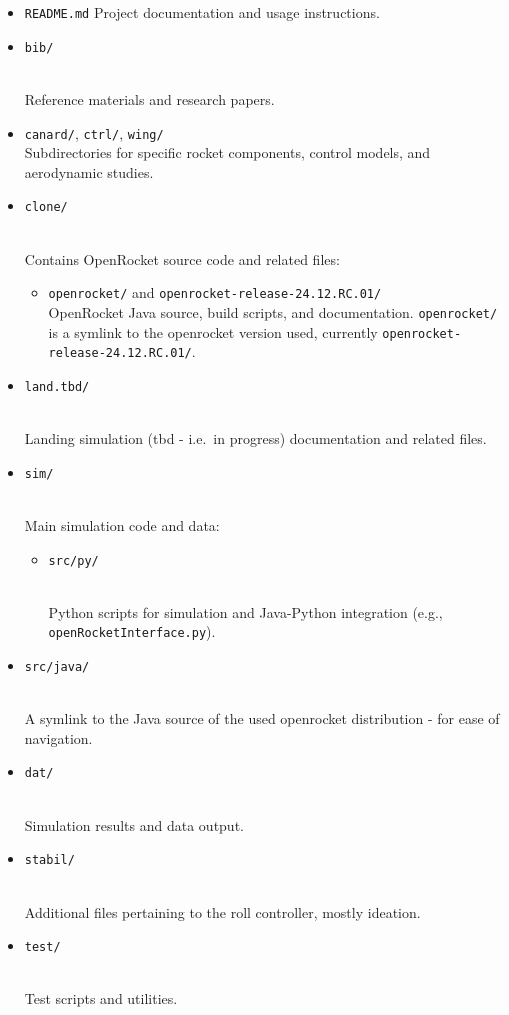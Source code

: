 \documentclass{amsdtx}
\providecommand{\tightlist}{%
  \setlength{\itemsep}{0pt}\setlength{\parskip}{0pt}}
\begin{document}
\begin{itemize}
\item
  \texttt{README.md} Project documentation and usage instructions.
\item
  \texttt{bib/}\strut \\
  Reference materials and research papers.
\item
  \texttt{canard/}, \texttt{ctrl/}, \texttt{wing/}\\
  Subdirectories for specific rocket components, control models, and
  aerodynamic studies.
\item
  \texttt{clone/}\strut \\
  Contains OpenRocket source code and related files:

  \begin{itemize}
  \tightlist
  \item
    \texttt{openrocket/} and \texttt{openrocket-release-24.12.RC.01/}\\
    OpenRocket Java source, build scripts, and documentation.
    \texttt{openrocket/} is a symlink to the openrocket version used,
    currently \texttt{openrocket-release-24.12.RC.01/}.
  \end{itemize}
\item
  \texttt{land.tbd/}\strut \\
  Landing simulation (tbd - i.e.~in progress) documentation and related
  files.
\item
  \texttt{sim/}\strut \\
  Main simulation code and data:

  \begin{itemize}
  \tightlist
  \item
    \texttt{src/py/}\strut \\
    Python scripts for simulation and Java-Python integration (e.g.,
    \texttt{openRocketInterface.py}).
  \end{itemize}
\item
  \texttt{src/java/}\strut \\
  A symlink to the Java source of the used openrocket distribution - for
  ease of navigation.
\item
  \texttt{dat/}\strut \\
  Simulation results and data output.
\item
  \texttt{stabil/}\strut \\
  Additional files pertaining to the roll controller, mostly ideation.
\item
  \texttt{test/}\strut \\
  Test scripts and utilities.
\end{itemize}
\end{document}
